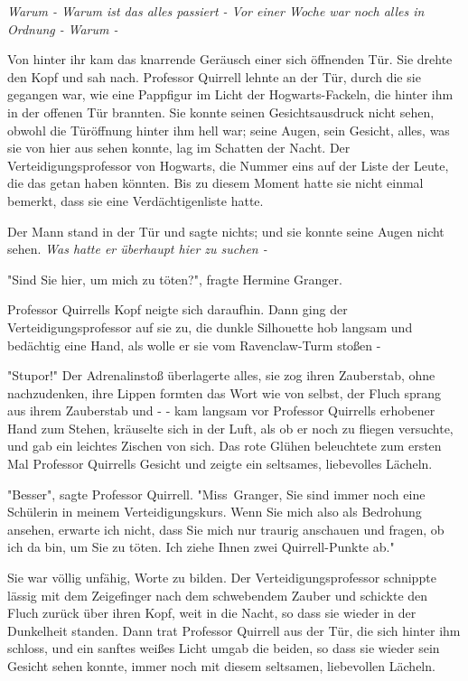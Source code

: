 {\emph{Warum - Warum ist das alles passiert - Vor einer Woche war noch alles in Ordnung -} \emph{Warum -}

Von hinter ihr kam das knarrende Geräusch einer sich öffnenden Tür. Sie drehte den Kopf und sah nach. Professor Quirrell lehnte an der Tür, durch die sie gegangen war, wie eine Pappfigur im Licht der Hogwarts-Fackeln, die hinter ihm in der offenen Tür brannten. Sie konnte seinen Gesichtsausdruck nicht sehen, obwohl die Türöffnung hinter ihm hell war; seine Augen, sein Gesicht, alles, was sie von hier aus sehen konnte, lag im Schatten der Nacht. Der Verteidigungsprofessor von Hogwarts, die Nummer eins auf der Liste der Leute, die das getan haben könnten. Bis zu diesem Moment hatte sie nicht einmal bemerkt, dass sie eine Verdächtigenliste hatte.

Der Mann stand in der Tür und sagte nichts; und sie konnte seine Augen nicht sehen. \emph{Was hatte er überhaupt hier zu suchen -}

"Sind Sie hier, um mich zu töten?", fragte Hermine Granger.

Professor Quirrells Kopf neigte sich daraufhin. Dann ging der Verteidigungsprofessor auf sie zu, die dunkle Silhouette hob langsam und bedächtig eine Hand, als wolle er sie vom Ravenclaw-Turm stoßen -

"Stupor!" Der Adrenalinstoß überlagerte alles, sie zog ihren Zauberstab, ohne nachzudenken, ihre Lippen formten das Wort wie von selbst, der Fluch sprang aus ihrem Zauberstab und - - kam langsam vor Professor Quirrells erhobener Hand zum Stehen, kräuselte sich in der Luft, als ob er noch zu fliegen versuchte, und gab ein leichtes Zischen von sich. Das rote Glühen beleuchtete zum ersten Mal Professor Quirrells Gesicht und zeigte ein seltsames, liebevolles Lächeln.

"Besser", sagte Professor Quirrell. "Miss~Granger, Sie sind immer noch eine Schülerin in meinem Verteidigungskurs. Wenn Sie mich also als Bedrohung ansehen, erwarte ich nicht, dass Sie mich nur traurig anschauen und fragen, ob ich da bin, um Sie zu töten. Ich ziehe Ihnen zwei Quirrell-Punkte ab."

Sie war völlig unfähig, Worte zu bilden. Der Verteidigungsprofessor schnippte lässig mit dem Zeigefinger nach dem schwebendem Zauber und schickte den Fluch zurück über ihren Kopf, weit in die Nacht, so dass sie wieder in der Dunkelheit standen. Dann trat Professor Quirrell aus der Tür, die sich hinter ihm schloss, und ein sanftes weißes Licht umgab die beiden, so dass sie wieder sein Gesicht sehen konnte, immer noch mit diesem seltsamen, liebevollen Lächeln.

}
